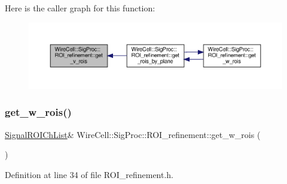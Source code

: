 Here is the caller graph for this function\+:
\nopagebreak
\begin{figure}[H]
\begin{center}
\leavevmode
\includegraphics[width=350pt]{class_wire_cell_1_1_sig_proc_1_1_r_o_i__refinement_abd0825bd27e31785fd255c90fab25df6_icgraph}
\end{center}
\end{figure}
\mbox{\label{class_wire_cell_1_1_sig_proc_1_1_r_o_i__refinement_a2a9a05d4936bffcc0946a2e7190d3112}} 
\subsubsection{\texorpdfstring{get\+\_\+w\+\_\+rois()}{get\_w\_rois()}}
{\footnotesize\ttfamily \hyperlink{namespace_wire_cell_1_1_sig_proc_a5b3db127bb7fb1e16d93fa60f52905af}{Signal\+R\+O\+I\+Ch\+List}\& Wire\+Cell\+::\+Sig\+Proc\+::\+R\+O\+I\+\_\+refinement\+::get\+\_\+w\+\_\+rois (\begin{DoxyParamCaption}{ }\end{DoxyParamCaption})\hspace{0.3cm}{\ttfamily [inline]}}



Definition at line 34 of file R\+O\+I\+\_\+refinement.\+h.

